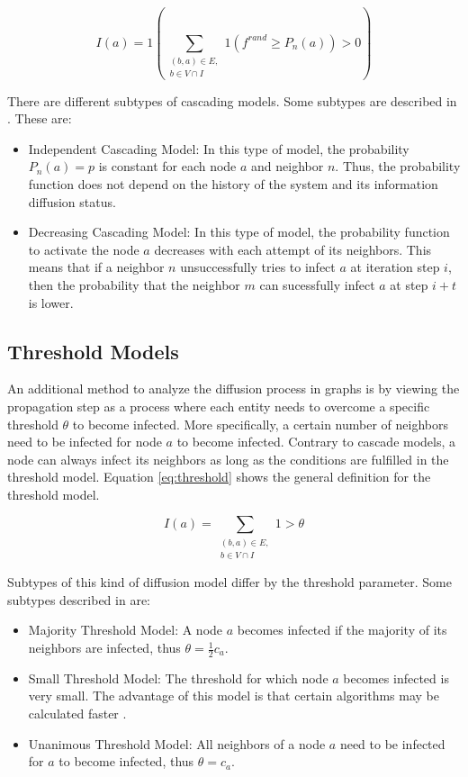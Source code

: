 \begin{equation}
    I(a) = 1 (\sum\limits_{\substack{(b,a)\in E, \\ b \in V \cap I}}
    1(f^{rand}\geq P_n(a))>0) 
    \label{eqbasicpropagationcascading}
\end{equation}

There are different subtypes of cascading models.
Some subtypes are described in \cite{diffusionbasics}. These are:

\begin{itemize}
    \item Independent Cascading Model: In this type of model, the 
    probability $P_n(a)=p$ is constant for each node $a$ and neighbor $n$.
    Thus, the probability function does not depend on the history 
    of the system and its information diffusion status.
    \item Decreasing Cascading Model: In this type of model, the probability
    function to activate the node $a$ decreases with each attempt of its 
    neighbors. This means that if a neighbor $n$ unsuccessfully tries to infect
    $a$ at iteration step $i$, then the probability that the neighbor $m$
    can sucessfully infect $a$ at step $i+t$ is lower.
\end{itemize}

\subsection{Threshold Models}
An additional method to analyze the diffusion process in graphs is by viewing the
propagation step as a process where each entity needs to overcome a 
specific threshold $\theta$ to become infected. More specifically, 
a certain number of neighbors need to be infected for node $a$ to become 
infected. Contrary to cascade models, a node can always 
infect its neighbors as long as the conditions are fulfilled in the threshold 
model. Equation \ref{eq:threshold} shows the general definition 
for the threshold model.

\begin{equation}
    I(a) = \sum\limits_{\substack{(b,a)\in E, \\ b \in V \cap I}}
    1 > \theta    
    \label{eq:threshold}
\end{equation}

Subtypes of this kind of diffusion model differ by the threshold parameter.
Some subtypes described in \cite{diffusionbasics} are:

\begin{itemize}
    \item Majority Threshold Model: A node $a$ becomes
    infected if the majority of its neighbors are infected, thus 
    $\theta = \frac{1}{2}c_a$.
    \item Small Threshold Model: The threshold for which
    node $a$ becomes infected is very small. The advantage of this model is that 
    certain algorithms may be calculated faster \cite{diffusionbasics}.
    \item Unanimous Threshold Model: All neighbors 
    of a node $a$ need to be infected for $a$ to become infected, thus
    $\theta = c_a$.
\end{itemize}



